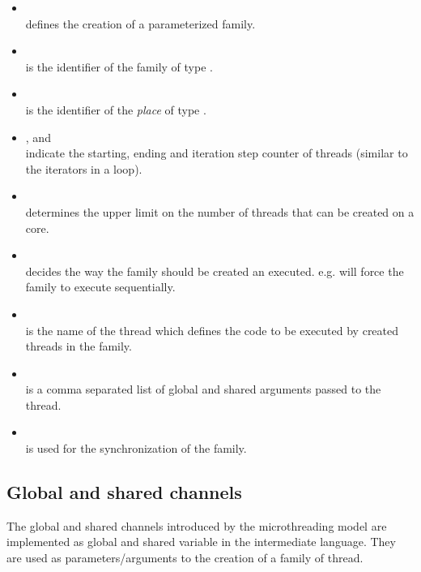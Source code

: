 \documentclass{article}
\begin{document}
\begin{itemize}

\item  \\defines the creation of a parameterized family.

\item  \\ is the identifier of the family of type .
    
\item  \\ is the identifier of the \emph{place} of type .

\item ,  and  \\ indicate the starting, ending and
    iteration step counter of threads (similar to the iterators in a loop).

\item  \\ determines the upper limit on the number of threads that
    can be created on a core.

\item  \\ decides the way the family should be created an executed.
    e.g.  will force the family to execute sequentially.

\item  \\ is the name of the thread which defines the code to be
    executed by created threads in the family.

\item  \\ is a comma separated list of global and shared arguments
    passed to the thread.

\item  \\ is used for the synchronization of the family.

\end{itemize}

\subsection*{Global and shared channels}

The global and shared channels introduced by the microthreading model are
implemented as global and shared variable in the intermediate language. They
are used as parameters/arguments to the creation of a family of thread.
\end{document}

